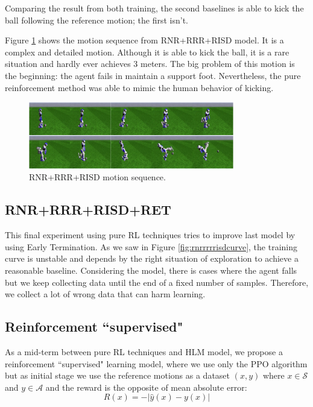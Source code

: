 Comparing the result from both training, the second baselines is able to kick the ball following the reference motion; the first isn't.

Figure \ref{fig:risdmotionsequence} shows the motion sequence from RNR+RRR+RISD model. It is a complex and detailed motion. Although it is able to kick the ball, it is a rare situation and hardly ever achieves 3 meters. The big problem of this motion is the beginning: the agent fails in maintain a support foot. Nevertheless, the pure reinforcement method was able to mimic the human behavior of kicking.

\begin{figure}[!htbp]
	\centering
	\includegraphics[width=0.8\textwidth]{Cap6/risdmotionsequence.eps}
	\caption{RNR+RRR+RISD motion sequence.}
	\label{fig:risdmotionsequence}
\end{figure}


\subsection{RNR+RRR+RISD+RET}

This final experiment using pure RL techniques tries to improve last model by using Early Termination. As we saw in Figure \ref{fig:rnrrrrrisdcurve}, the training curve is unstable and depends by the right situation of exploration to achieve a reasonable baseline. Considering the model, there is cases where the agent falls but we keep collecting data until the end of a fixed number of samples. Therefore, we collect a lot of wrong data that can harm learning.


\subsection{Reinforcement ``supervised"}\label{sec:suprl}

As a mid-term between pure RL techniques and HLM model, we propose a reinforcement ``supervised" learning model, where we use only the PPO algorithm but as initial stage we use the reference motions as a dataset $(x, y)$ where $x \in \mathcal{S}$ and $y \in \mathcal{A}$ and the reward is the opposite of mean absolute error:
\begin{equation}
R(x) = - \lvert \hat y(x) - y(x) \rvert 
\end{equation}

